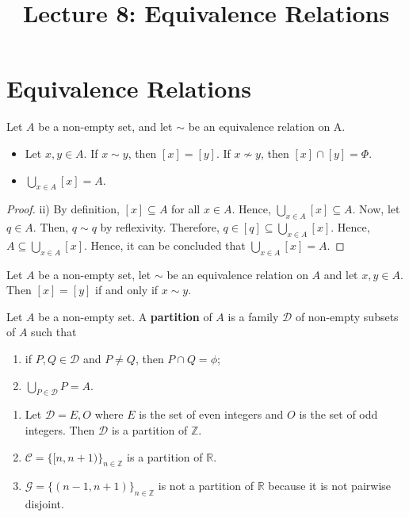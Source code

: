 \documentclass[a4paper,english,12pt]{article}
\title{Lecture 8: Equivalence Relations}
\author{}
\begin{document}
\maketitle

\section{Equivalence Relations}
\begin{thm} Let $A$ be a non-empty set, and let $\sim$ be an equivalence relation on A.
	\begin{itemize}
		\item Let $x,y \in A$. If $x \sim y$, then $[x] = [y]$. If $x \nsim y$, then $[x] \cap [y] = \Phi$.
		\item $\bigcup\limits_{{x\in A}} [x] = A$.
	\end{itemize}
\end{thm}

\begin{proof} ii) By definition, $[x] \subseteq A$ for all $x \in A$. Hence, $\bigcup\limits_{{x \in A}} [x] \subseteq A$. Now, let $q \in A$. Then, $q \sim q$ by reflexivity. Therefore, $q \in [q] \subseteq \bigcup\limits_{{x \in A}} [x]$. Hence, $A \subseteq \bigcup\limits_{{x \in A}} [x]$. Hence, it can be concluded that $\bigcup\limits_{{x \in A}} [x] = A$.
\end{proof}

\begin{cor} Let $A$ be a non-empty set, let $\sim$ be an equivalence relation on $A$ and let $x, y \in A$. Then $[x] = [y]$ if and only if $x \sim y$.
\end{cor}

\begin{defn} Let $A$ be a non-empty set. A \textbf{partition} of $A$ is a family $\mathcal{D}$ of non-empty subsets of $A$ such that
	\begin{enumerate}
		\item if $P,Q \in \mathcal{D}$ and $P \neq Q$, then $P \cap Q = \phi$;
		\item $\bigcup \limits_{{P \in \mathcal{D}}} P = A$.
	\end{enumerate}
	
\end{defn}

\begin{exmp}
	\begin{enumerate}
		\item Let $\mathcal{D} = {E,O}$ where $E$ is the set of even integers and $O$ is the set of odd integers. Then $\mathcal{D}$ is a partition of $\mathbb{Z}$.
		\item $\mathcal{C} = \{[n,n+1)\}_{n \in \mathbb{Z}}$ is a partition of $\mathbb{R}$.
		\item $\mathcal{G} =\{(n-1,n+1)\}_{n \in \mathbb{Z}}$ is not a partition of $\mathbb{R}$ because it is not pairwise disjoint.
	\end{enumerate}
\end{exmp}
\end{document}
